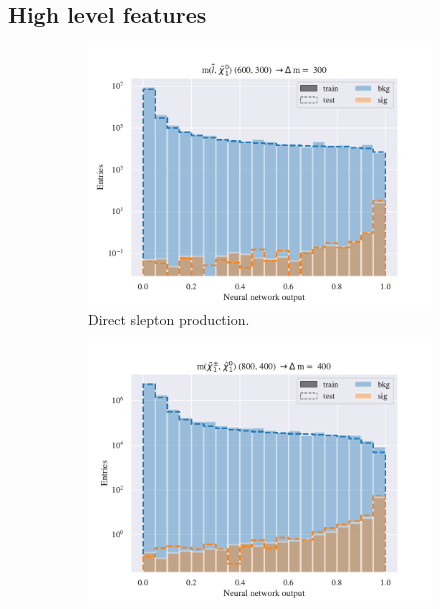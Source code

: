 \subsection{High level features}

\begin{figure}[H]
    \centering
    \begin{subfigure}[t!]{0.49\textwidth}
        \includegraphics[width = \textwidth]{Figures/SlepSlep/ML/NN/High_level/Inter/scaled_train_test_396014.pdf}
        \caption{Direct slepton production.}
        \label{fig:}
    \end{subfigure}
    \begin{subfigure}[t!]{0.49\textwidth}
        \includegraphics[width = \textwidth]{Figures/SlepSnu/NN/High_level/Inter/scaled_train_test_397150.pdf}

\end{subfigure}
\end{figure}
